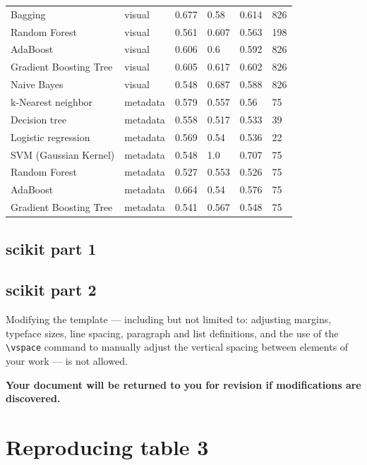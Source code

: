 \documentclass[sigconf]{acmart}
\begin{document}
\begin{table}[]
\begin{tabular}{llllll}
Bagging                & visual   & 0.677     & 0.58   & 0.614 & 826           \\
Random Forest          & visual   & 0.561     & 0.607  & 0.563 & 198           \\
AdaBoost               & visual   & 0.606     & 0.6    & 0.592 & 826           \\
Gradient Boosting Tree & visual   & 0.605     & 0.617  & 0.602 & 826           \\
Naive Bayes            & visual   & 0.548     & 0.687  & 0.588 & 826           \\
k-Nearest neighbor     & metadata & 0.579     & 0.557  & 0.56  & 75            \\
Decision tree          & metadata & 0.558     & 0.517  & 0.533 & 39            \\
Logistic regression    & metadata & 0.569     & 0.54   & 0.536 & 22            \\
SVM (Gaussian Kernel)  & metadata & 0.548     & 1.0    & 0.707 & 75            \\
Random Forest          & metadata & 0.527     & 0.553  & 0.526 & 75            \\
AdaBoost               & metadata & 0.664     & 0.54   & 0.576 & 75            \\
Gradient Boosting Tree & metadata & 0.541     & 0.567  & 0.548 & 75            \\ \hline
\end{tabular}
\end{table}

\subsection{scikit part 1}
\subsection{scikit part 2}
Modifying the template --- including but not limited to: adjusting
margins, typeface sizes, line spacing, paragraph and list definitions,
and the use of the \verb|\vspace| command to manually adjust the
vertical spacing between elements of your work --- is not allowed.

{\bfseries Your document will be returned to you for revision if
  modifications are discovered.}

\section{Reproducing table 3}
\end{document}
